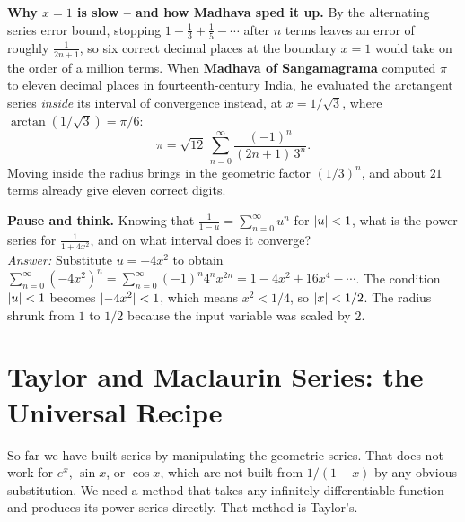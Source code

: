 \begin{marginnotebox}
\textbf{Why $x=1$ is slow -- and how Madhava sped it up.}
By the alternating series error bound, stopping $1 - \tfrac13 + \tfrac15 - \cdots$ after $n$ terms leaves an error of roughly $\tfrac{1}{2n+1}$, so six correct decimal places at the boundary $x=1$ would take on the order of a million terms. When \textbf{Madhava of Sangamagrama} computed $\pi$ to eleven decimal places in fourteenth-century India, he evaluated the arctangent series \emph{inside} its interval of convergence instead, at $x = 1/\sqrt{3}$, where $\arctan(1/\sqrt3) = \pi/6$:
\[
  \pi = \sqrt{12}\,\sum_{n=0}^{\infty} \frac{(-1)^n}{(2n+1)\,3^n}.
\]
Moving inside the radius brings in the geometric factor $(1/3)^n$, and about $21$ terms already give eleven correct digits.
\end{marginnotebox}

\begin{recoverybox}
\textbf{Pause and think.} Knowing that $\frac{1}{1-u} = \sum_{n=0}^{\infty} u^n$ for $\lvert u\rvert<1$, what is the power series for $\frac{1}{1+4x^2}$, and on what interval does it converge?
\\[0.4em]
\emph{Answer:} Substitute $u = -4x^2$ to obtain $\sum_{n=0}^{\infty} (-4x^2)^n = \sum_{n=0}^{\infty} (-1)^n 4^n x^{2n} = 1 - 4x^2 + 16x^4 - \cdots$. The condition $\lvert u\rvert < 1$ becomes $\lvert-4x^2\rvert < 1$, which means $x^2 < 1/4$, so $\lvert x\rvert < 1/2$. The radius shrunk from $1$ to $1/2$ because the input variable was scaled by $2$.
\end{recoverybox}

\section{Taylor and Maclaurin Series: the Universal Recipe}
\label{ch30:sec-taylor}

So far we have built series by manipulating the geometric series. That does not work for $e^x$, $\sin x$, or $\cos x$, which are not built from $1/(1-x)$ by any obvious substitution. We need a method that takes any infinitely differentiable function and produces its power series directly. That method is Taylor's.

